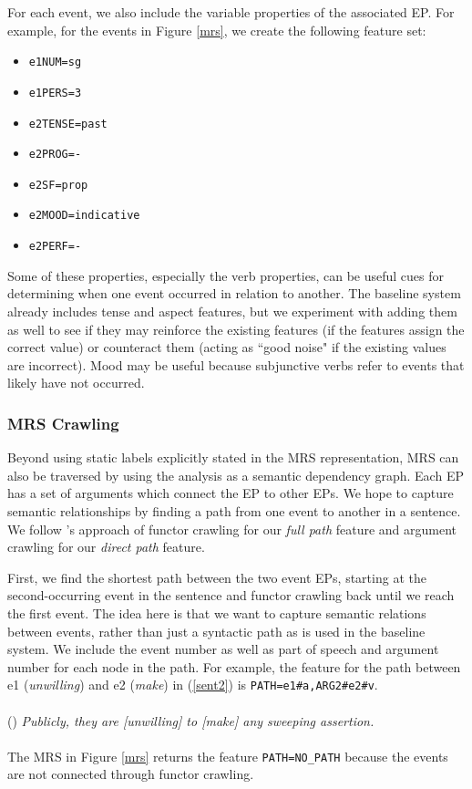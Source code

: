 \documentclass[11pt]{article}
\begin{document}
For each event, we also include the variable properties of the associated EP. For example, for the events in Figure \ref{mrs}, we create the following feature set:

\begin{itemize}
\setlength\itemsep{-0.5em}
\item \texttt{e1NUM=sg}
\item \texttt{e1PERS=3}
\item \texttt{e2TENSE=past}
\item \texttt{e2PROG=-}
\item \texttt{e2SF=prop}
\item \texttt{e2MOOD=indicative}
\item \texttt{e2PERF=-}
\end{itemize}

Some of these properties, especially the verb properties, can be useful cues for determining when one event occurred in relation to another. The baseline system already includes tense and aspect features, but we experiment with adding them as well to see if they may reinforce the existing features (if the features assign the correct value) or counteract them (acting as ``good noise" if the existing values are incorrect). Mood may be useful because subjunctive verbs refer to events that likely have not occurred.

\subsubsection{MRS Crawling}

Beyond using static labels explicitly stated in the MRS representation, MRS can also be traversed by using the analysis as a semantic dependency graph. Each EP has a set of arguments which connect the EP to other EPs. We hope to capture semantic relationships by finding a path from one event to another in a sentence. We follow 's approach of functor crawling for our \emph{full path} feature and argument crawling for our \emph{direct path} feature.

First, we find the shortest path between the two event EPs, starting at the second-occurring event in the sentence and functor crawling back until we reach the first event. The idea here is that we want to capture semantic relations between events, rather than just a syntactic path as is used in the baseline system. We include the event number as well as part of speech and argument number for each node in the path. For example, the feature for the path between e1 (\emph{unwilling}) and e2 (\emph{make}) in (\ref{sent2}) is \texttt{PATH=e1\#a,ARG2\#e2\#v}.\\\\
(\exampleno)\label{sent2} \emph{Publicly, they are [unwilling] to [make] any sweeping assertion.}\\\\
The MRS in Figure \ref{mrs} returns the feature \texttt{PATH=NO\_PATH} because the events are not connected through functor crawling.
\end{document}
